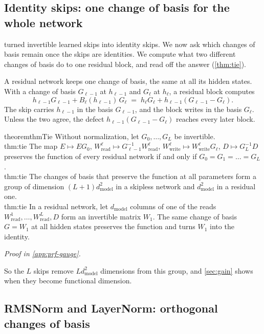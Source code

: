 \documentclass[10pt]{article}
\theoremstyle{definition}
\theoremstyle{remark}
\newcommand{\Wread}{W_{\mathrm{read}}}
\newcommand{\Wwrite}{W_{\mathrm{write}}}
\newcommand{\dm}{d_{\mathrm{model}}}
\newcommand{\ptlabel}[1]{\phantomsection\label{#1}}
\newcommand{\proofin}[1]{\par\vspace{-0.4\baselineskip}\noindent\hfill{\small\itshape Proof in \cref{#1}.}\par\smallskip}
\newcommand{\stpart}[3]{\ifx\relax#1\relax\else\ptlabel{#1:#2}\fi{\upshape\bfseries\boldmath(#2)\ifx\relax#3\relax\else\ #3.\fi}}
\begin{document}
\subsection{Identity skips: one change of basis for the whole network}\label{sec:global}\label{sec:gaugefix}

 turned invertible learned skips into identity skips. We now ask which changes of basis remain once the skips are identities. We compute what two different changes of basis do to one residual block, and read off the answer (\cref{thm:tie}).

A residual network keeps one change of basis, the same at all its hidden states. With a change of basis $G_{\ell-1}$ at $h_{\ell-1}$ and $G_\ell$ at $h_\ell$, a residual block computes
\begin{equation}\label{eq:defect}
h_{\ell-1}G_{\ell-1} + B_\ell(h_{\ell-1})\,G_\ell \;=\; h_\ell G_\ell + h_{\ell-1}(G_{\ell-1} - G_\ell).
\end{equation}
The skip carries $h_{\ell-1}$ in the basis $G_{\ell-1}$, and the block writes in the basis $G_\ell$. Unless the two agree, the defect $h_{\ell-1}(G_{\ell-1} - G_\ell)$ reaches every later block.

\begin{restatable}{theorem}{thmTie}\label{thm:tie}
Without normalization, let $G_0, \dots, G_L$ be invertible.\\
\stpart{thm:tie}{i}{} The map $E \mapsto EG_0$, $\Wread^{\ell} \mapsto G_{\ell-1}^{-1}\Wread^{\ell}$, $\Wwrite^{\ell} \mapsto \Wwrite^{\ell}G_\ell$, $D \mapsto G_L^{-1}D$ preserves the function of every residual network if and only if $G_0 = G_1 = \dots = G_L$.\\
\stpart{thm:tie}{ii}{} The changes of basis that preserve the function at all parameters form a group of dimension $(L+1)\dm^2$ in a skipless network and $\dm^2$ in a residual one.\\
\stpart{thm:tie}{iii}{} In a residual network, let $\dm$ columns of one of the reads $\Wread^{1}, \dots, \Wread^{L}, D$ form an invertible matrix $W_1$. The same change of basis $G = W_1$ at all hidden states preserves the function and turns $W_1$ into the identity.
\end{restatable}
\proofin{app:prf-gauge}

So the $L$ skips remove $L\dm^2$ dimensions from this group, and \cref{sec:gain} shows when they become functional dimension.

\subsection{RMSNorm and LayerNorm: orthogonal changes of basis}\label{sec:norm}
\end{document}
